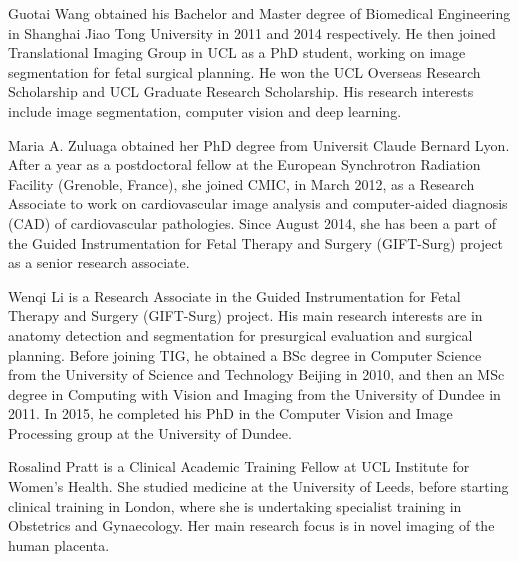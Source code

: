 \documentclass[10pt,journal,compsoc]{IEEEtran}
\begin{document}
\begin{IEEEbiography}{Guotai Wang}
obtained his Bachelor and Master degree of Biomedical Engineering in Shanghai Jiao Tong University in 2011 and 2014 respectively. %
He then joined Translational Imaging Group in UCL as a PhD student, working on image segmentation for fetal surgical planning. He won the UCL Overseas Research Scholarship and UCL Graduate Research Scholarship. His research interests include image segmentation, computer vision and deep learning.

\end{IEEEbiography}
\begin{IEEEbiography}{Maria A. Zuluaga}
obtained her PhD degree from Universit Claude Bernard Lyon. %
After a year as a postdoctoral fellow at the European Synchrotron Radiation Facility (Grenoble, France), she joined CMIC, in March 2012, as a Research Associate to work on cardiovascular image analysis and computer-aided diagnosis (CAD) of cardiovascular pathologies. Since August 2014, she has been a part of the Guided Instrumentation for Fetal Therapy and Surgery (GIFT-Surg) project as a senior research associate.
\end{IEEEbiography}
\begin{IEEEbiography}{Wenqi Li} is a Research Associate in the Guided Instrumentation for Fetal Therapy and Surgery (GIFT-Surg) project. His main research interests are in anatomy detection and segmentation for presurgical evaluation and surgical planning. Before joining TIG, he obtained a BSc degree in Computer Science from the University of Science and Technology Beijing in 2010, and then an MSc degree in Computing with Vision and Imaging from the University of Dundee in 2011. In 2015, he completed his PhD in the Computer Vision and Image Processing group at the University of Dundee.
\end{IEEEbiography}

\begin{IEEEbiography}{Rosalind Pratt} is a Clinical Academic Training Fellow at UCL Institute for Women's Health. She studied medicine at the University of Leeds, before starting clinical training in London, where she is undertaking specialist training in Obstetrics and Gynaecology. Her main research focus is in novel imaging of the human placenta.
\end{IEEEbiography}
\end{document}
